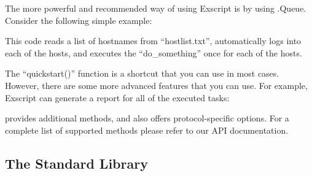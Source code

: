 The more powerful and recommended way of using Exscript is by using 
\product.Queue.
Consider the following simple example:



This code reads a list of hostnames from ``hostlist.txt'', automatically
logs into each of the hosts, and executes the ``do\_something'' once
for each of the hosts.

The ``quickstart()'' function is a shortcut that you can use in most cases.
However, there are some more advanced features that you can use. For
example, Exscript can generate a report for all of the executed tasks:



\product provides additional methods, and also offers protocol-specific 
options. For a complete list of supported methods please refer to our API 
documentation.


\begin{appendix}
\section{The Standard Library}
\label{stdlib}

\end{appendix}



